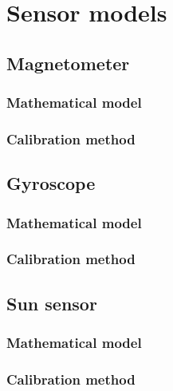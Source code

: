 \chapter{Sensor models}
\label{sensorModels}

\section{Magnetometer}
\subsection{Mathematical model}
\subsection{Calibration method}

\section{Gyroscope}
\subsection{Mathematical model}
\subsection{Calibration method}

\section{Sun sensor}
\subsection{Mathematical model}
\subsection{Calibration method}
